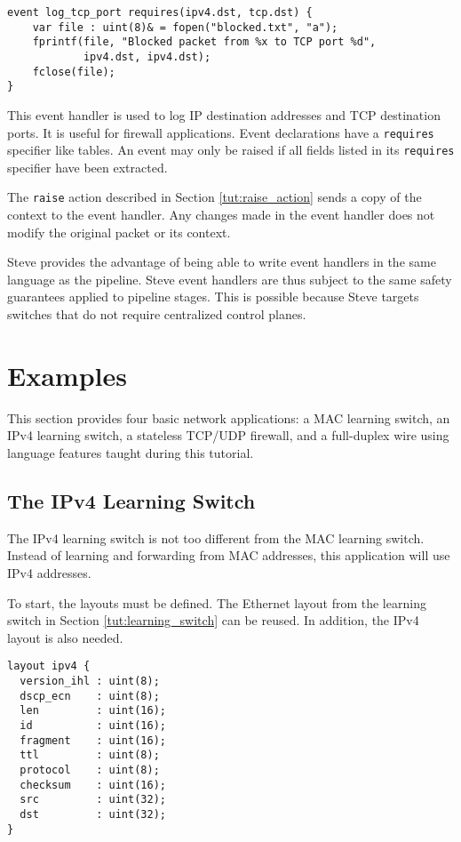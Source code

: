 \begin{codepage}
\begin{lstlisting}
event log_tcp_port requires(ipv4.dst, tcp.dst) {
	var file : uint(8)& = fopen("blocked.txt", "a");
	fprintf(file, "Blocked packet from %x to TCP port %d", 
			ipv4.dst, ipv4.dst);
	fclose(file);
}
\end{lstlisting}
\end{codepage}

This event handler is used to log IP destination addresses and
TCP destination ports. It is useful for firewall applications.
Event declarations have a \texttt{requires} specifier
like tables. An event may only be raised if all fields listed in its
\texttt{requires} specifier have been extracted.

The \texttt{raise} action described in Section \ref{tut:raise_action}
sends a copy of the context to the event handler.
Any changes made in the event handler does not modify the
original packet or its context.

Steve provides the advantage of being able to write event handlers
in the same language as the pipeline. 
Steve event handlers are thus subject to the same safety
guarantees applied to pipeline stages.
This is possible because Steve targets switches that do not require
centralized control planes.

\section{Examples} \label{tut:examples}

This section provides four basic network applications: a MAC learning switch, an IPv4 learning switch, a stateless TCP/UDP firewall, and a
full-duplex wire using language features taught during this tutorial.

\subsection{The IPv4 Learning Switch} \label{tut:learning_router}

The IPv4 learning switch is not too different from the MAC learning switch. 
Instead of learning and forwarding from MAC addresses, this application will use 
IPv4 addresses.

To start, the layouts must be defined. The Ethernet layout
from the learning switch in Section \ref{tut:learning_switch} can be reused. 
In addition, the IPv4 layout is also needed.

\begin{codepage}
\begin{lstlisting}
layout ipv4 {
  version_ihl : uint(8);
  dscp_ecn    : uint(8);
  len         : uint(16);
  id          : uint(16);
  fragment    : uint(16);
  ttl         : uint(8);
  protocol    : uint(8);
  checksum    : uint(16);
  src         : uint(32);
  dst         : uint(32);
}
\end{lstlisting}
\end{codepage}

